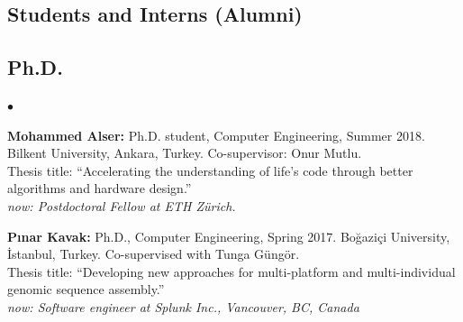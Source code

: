 \documentclass[margin,line]{res}
\newenvironment{list2}{
  \begin{list}{$\bullet$}{%
      \setlength{\itemsep}{0in}
      \setlength{\parsep}{0in} \setlength{\parskip}{0in}
      \setlength{\topsep}{0in} \setlength{\partopsep}{0in} 
      \setlength{\leftmargin}{0.2in}}}{\end{list}}
\begin{document}
\begin{resume}
\vspace*{-.4cm}


\clearpage

\section{\sc Students and Interns (Alumni)}
\vspace*{-.4cm}
\subsection{\small \sc Ph.D.}
\begin{list2}
\item
  {\bf Mohammed Alser:} Ph.D. student, Computer Engineering, Summer 2018.
  Bilkent University, Ankara, Turkey. Co-supervisor: Onur Mutlu.\\
  Thesis title: ``Accelerating the understanding of life’s code through better algorithms and hardware design.''\\
  {\it now: Postdoctoral Fellow at ETH Zürich.}
\item
  {\bf P{\i}nar Kavak:} Ph.D., Computer Engineering, Spring 2017.
  Bo\u{g}azi\c{c}i University, \.{I}stanbul, Turkey. Co-supervised with Tunga G\"{u}ng\"{o}r.\\
  Thesis title: ``Developing new approaches for multi-platform and multi-individual genomic sequence assembly.''\\
  {\it now: Software engineer at Splunk Inc., Vancouver, BC, Canada}
\end{list2}

\vspace*{-.4cm}

\end{resume}
\end{document}
